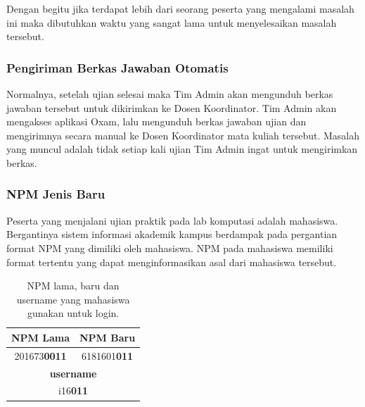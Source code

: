     Dengan begitu jika terdapat lebih dari seorang peserta yang mengalami
    masalah ini maka dibutuhkan waktu yang sangat lama untuk menyelesaikan
    masalah tersebut.

    \subsubsection{Pengiriman Berkas Jawaban
    Otomatis}\label{ref-prob-admin-pengiriman-berkas} 
    Normalnya, setelah ujian
    selesai maka Tim Admin akan mengunduh berkas jawaban tersebut untuk
    dikirimkan ke Dosen Koordinator. Tim Admin akan mengakses aplikasi Oxam,
    lalu mengunduh berkas jawaban ujian dan mengirimnya secara manual ke Dosen
    Koordinator mata kuliah tersebut. Masalah yang muncul adalah tidak setiap
    kali ujian Tim Admin ingat untuk mengirimkan berkas.
    
    \subsubsection{NPM Jenis Baru}\label{ref-prob-admin-npm-baru} 
    Peserta yang
    menjalani ujian praktik pada lab komputasi adalah mahasiswa. Bergantinya
    sistem informasi akademik kampus berdampak pada pergantian format NPM yang
    dimiliki oleh mahasiswa. NPM pada mahasiswa memiliki format tertentu yang
    dapat menginformasikan asal dari mahasiswa tersebut.

    \begin{table}[H]
        \centering
        \def\arraystretch{2}
        \begin{tabular}{|c|c|}
            \hline
            \textbf{NPM Lama} & \textbf{NPM Baru} \\
            \hline
            201673\textbf{0011} & 6181601\textbf{011} \\
            \hline
            \multicolumn{2}{|c|}{\textbf{username}} \\
            \hline
            \multicolumn{2}{|c|}{i16\textbf{011}} \\
            \hline
        \end{tabular}
        \caption{NPM lama, baru dan username yang mahasiswa gunakan untuk login.}
        \label{tab:table-npm-detail}
    \end{table}
    
